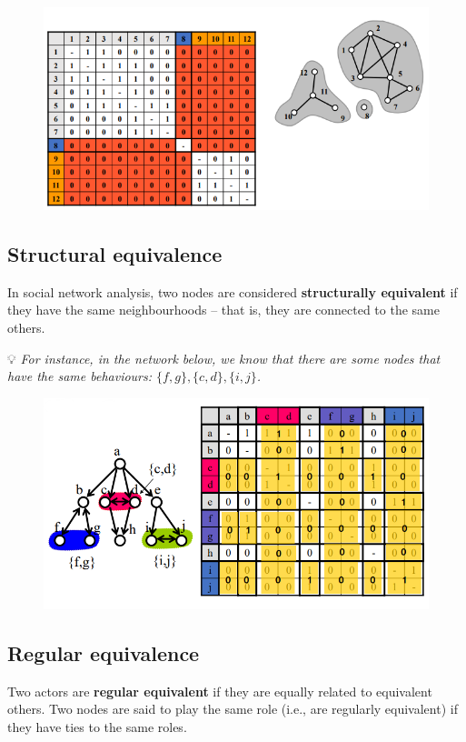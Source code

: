 \documentclass[
  notitlepage,
  onecolumn,
  openany]{book}
\begin{document}
\begin{figure}[h!]

{\centering \includegraphics[width=0.5\linewidth]{images/11-Subgroups and Structural Equivalence/Untitled 3} 

}

\end{figure}

\hypertarget{structural-equivalence}{%
\subsection{Structural equivalence}\label{structural-equivalence}}

In social network analysis, two nodes are considered \textbf{structurally equivalent} if they have the same neighbourhoods -- that is, they are connected to the same others.

💡 \emph{For instance, in the network below, we know that there are some nodes that have the same behaviours: \(\{f, g\}, \{c, d\}, \{i, j\}\).}

\begin{figure}[h!]

{\centering \includegraphics[width=0.5\linewidth]{images/11-Subgroups and Structural Equivalence/Untitled 4} 

}

\end{figure}

\hypertarget{regular-equivalence}{%
\subsection{Regular equivalence}\label{regular-equivalence}}

Two actors are \textbf{regular equivalent} if they are equally related to equivalent others. Two nodes are said to play the same role (i.e., are regularly equivalent) if they have ties to the same roles.
\end{document}
